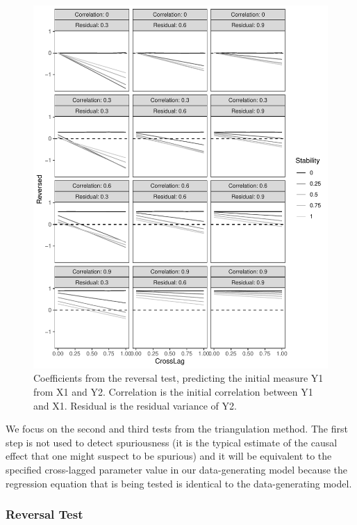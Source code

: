 \documentclass[
  man,floatsintext]{apa6}
\begin{document}
\begin{figure}
\centering
\includegraphics{triangulation_files/figure-latex/sim1-1.pdf}
\caption{\label{fig:sim1}Coefficients from the reversal test, predicting the initial measure Y1 from X1 and Y2. Correlation is the initial correlation between Y1 and X1. Residual is the residual variance of Y2.}
\end{figure}

We focus on the second and third tests from the triangulation method. The first step is not used to detect spuriousness (it is the typical estimate of the causal effect that one might suspect to be spurious) and it will be equivalent to the specified cross-lagged parameter value in our data-generating model because the regression equation that is being tested is identical to the data-generating model.

\subsubsection{Reversal Test}\label{reversal-test}
\end{document}
